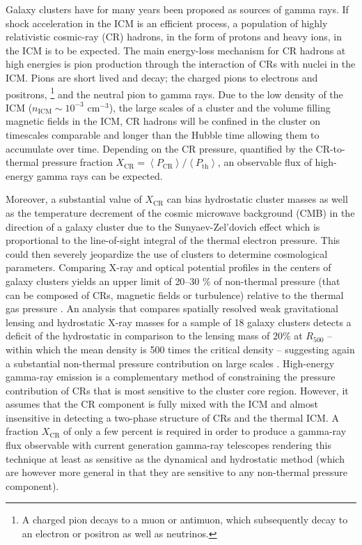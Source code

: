 \documentclass[12pt,manuscript]{aastex}
\newcommand{\expval}[1]{\left\langle #1 \right\rangle}
\newcommand{\CR}{\mathrm{CR}}
\begin{document}
Galaxy clusters have for many years been proposed as sources of gamma rays. If shock acceleration
in the ICM is an efficient process, a population of highly relativistic cosmic-ray (CR) hadrons,
in the form of protons and heavy ions, in the ICM is to be expected. The main energy-loss
mechanism for CR hadrons at high energies is pion production through the interaction of CRs with
nuclei in the ICM. Pions are short lived and decay; the charged pions to electrons and positrons,
\footnote{A charged pion decays to a muon or antimuon, which subsequently decay to an electron or
positron as well as neutrinos.} and the neutral pion to gamma rays. Due to the low density of the
ICM ($n_{\mathrm{ICM}}\sim 10^{-3}$ cm$^{-3}$), the large scales of a cluster and the volume
filling magnetic fields in the ICM, CR hadrons will be confined in the cluster on timescales
comparable and longer than the Hubble time \citep[][]{article:Volk_etal:1996,
article:Berezinsky_etal:1997} allowing them to accumulate over time. Depending on the CR pressure,
quantified by the CR-to-thermal pressure fraction
$X_\CR=\expval{P_{\CR}}/\expval{P_{\mathrm{th}}}$, an observable flux of high-energy gamma rays
can be expected.

Moreover, a substantial value of $X_\CR$ can bias hydrostatic cluster masses as well as the
temperature decrement of the cosmic microwave background (CMB) in the direction of a galaxy cluster
due to the Sunyaev-Zel'dovich effect which is proportional to the line-of-sight integral of the
thermal electron pressure. This could then severely jeopardize the use of clusters to determine
cosmological parameters. Comparing X-ray and optical potential profiles in the centers of galaxy
clusters yields an upper limit of 20--30 \% of non-thermal pressure (that can be composed of CRs,
magnetic fields or turbulence) relative to the thermal gas pressure
\citep{article:Churazov_etal:2008, article:Churazov_etal:2010}. An analysis that compares spatially
resolved weak gravitational lensing and hydrostatic X-ray masses for a sample of 18 galaxy clusters
detects a deficit of the hydrostatic in comparison to the lensing mass of $20 \%$ at $R_{500}$ --
within which the mean density is 500 times the critical density -- suggesting again a substantial
non-thermal pressure contribution on large scales \citep{article:Mahdavi_etal:2008}. High-energy
gamma-ray emission is a complementary method of constraining the pressure contribution of CRs that
is most sensitive to the cluster core region. However, it assumes that the CR component is fully
mixed with the ICM and almost insensitive in detecting a two-phase structure of CRs and the thermal
ICM.  A fraction $X_\CR$ of only a few percent is required in order to produce a gamma-ray flux
observable with current generation gamma-ray telescopes rendering this technique at least as
sensitive as the dynamical and hydrostatic method (which are however more general in that they are
sensitive to any non-thermal pressure component).
\end{document}
